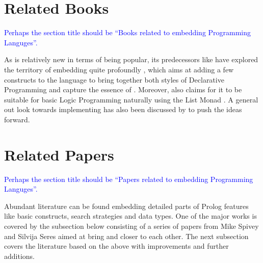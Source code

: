 \documentclass[thesis-solanki.tex]{subfiles}
\begin{document}
\section{Related Books}
\textcolor{blue}{Perhaps the section title should be ``Books related to embedding Programming Languges''.}

As  is relatively new in terms of being popular, its predecessors like  have
explored the territory of embedding  quite profoundly \cite{friedman05reasoned}, which aims at adding a few
constructs to the language to bring together both styles of Declarative Programming and capture the essence of
.
Moreover,  also claims for it to be suitable for basic Logic Programming naturally using the List
Monad \cite{website:logicprogexamplehaskell}.
A general out look towards implementing  has also been discussed by
\cite{krishnamurthi2007programming} to push the ideas forward.

\begin{comment}
All the more \textit{Prologish} things exist in Haskell, as mentioned alone it is not the only one if we consider it in the ''Scheme'' \cite{friedman05reasoned} of things and so is replication to other languages \cite{krishnamurthi2007programming}.
\end{comment}

\begin{comment}
\begin{enumerate}
\item The Reasoned Schemer, Daniel P. Friedman, William E. Byrd, Oleg Kiselyov

\item Programming Languages: Application and Interpretation, Shriram Krishnamurthi,
\\*  Chapters 33-34 of PLAI discuss Prolog and implementing Prolog

\end{enumerate}
\end{comment}

\section{Related Papers}
\textcolor{blue}{Perhaps the section title should be ``Papers related to embedding Programming Languges''.}

Abundant literature 
can be found  embedding detailed parts of Prolog features
like basic constructs, search strategies and data types.
One of the major works is covered by the subsection below consisting of a series of papers from Mike Spivey and
Silvija Seres aimed at bring  and  closer to each other.
The next subsection covers the literature based on the above
with improvements and further additions.
\end{document}
